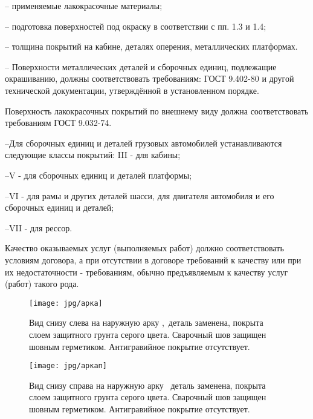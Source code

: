 {   -- применяемые лакокрасочные материалы;
   
   -- подготовка поверхностей под окраску в соответствии с пп. 1.3 и 1.4;
   
   -- толщина покрытий на кабине, деталях оперения, металлических платформах.
   
   
   
   
   -- Поверхности металлических деталей и сборочных единиц, подлежащие окрашиванию, должны соответствовать требованиям: ГОСТ 9.402-80 и другой технической документации, утверждённой в установленном порядке.
   
   
   Поверхность лакокрасочных покрытий по внешнему виду должна соответствовать требованиям ГОСТ 9.032-74.
   
   --Для сборочных единиц и деталей грузовых автомобилей устанавливаются следующие классы покрытий:
   III - для кабины;
   
   --V - для сборочных единиц и деталей платформы;
   
   --VI - для рамы и других деталей шасси, для двигателя автомобиля и его сборочных единиц и деталей;
   
   --VII - для рессор.
   
   
      
   \par 
   Качество  оказываемых  услуг  (выполняемых  работ)  должно
   соответствовать  условиям  договора,  а  при  отсутствии в договоре  требований  к  качеству  или  при их недостаточности - требованиям,
   обычно предъявляемым к качеству услуг (работ) такого рода.
   
   \begin{figure}[H]\centering
   	\parbox[t]{0.49\textwidth}
   	{\centering
   		\texttt{[image: jpg/арка]}
   		\caption{\footnotesize {Вид снизу слева на наружную арку ,\, деталь заменена, покрыта слоем защитного грунта серого цвета. Сварочный шов защищен шовным герметиком. Антигравийное покрытие отсутствует.}}
   		\label{аркалевая}}
   	\hfil \hfil
   	\parbox[t]{0.49\textwidth}
   	{\centering
   		\texttt{[image: jpg/аркап]}
   		\caption{\footnotesize {Вид снизу справа на наружную арку \tc\, деталь заменена, покрыта слоем защитного грунта серого цвета. Сварочный шов защищен шовным герметиком. Антигравийное покрытие отсутствует.}}
   		\label{аркаправая}}
   \end{figure}

}
